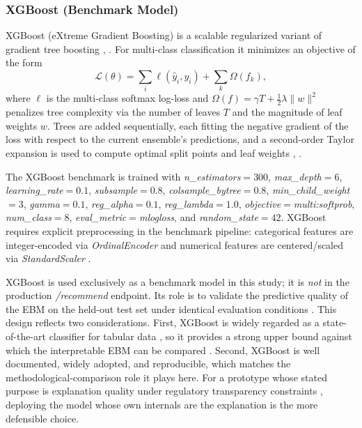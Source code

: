\documentclass{icsthesis}
\begin{document}
\begin{mainmatter}
				\subsubsection{XGBoost (Benchmark Model)}
					XGBoost (eXtreme Gradient Boosting) is a scalable regularized variant of gradient tree boosting \cite{ref16}, \cite{ref67}. For multi-class classification it minimizes an objective of the form
					\begin{equation*}
					    \mathcal{L}(\theta) = \sum_{i} \ell(\hat{y}_i, y_i) + \sum_{k} \Omega(f_k),
					\end{equation*}
					where $\ell$ is the multi-class softmax log-loss and $\Omega(f) = \gamma T + \tfrac{1}{2}\lambda \| w \|^2$ penalizes tree complexity via the number of leaves $T$ and the magnitude of leaf weights $w$. Trees are added sequentially, each fitting the negative gradient of the loss with respect to the current ensemble's predictions, and a second-order Taylor expansion is used to compute optimal split points and leaf weights \cite{ref16}, \cite{ref67}.

					The XGBoost benchmark is trained with \emph{n\_estimators}$=300$, \emph{max\_depth}$=6$, \emph{learning\_rate}$=0.1$, \emph{subsample}$=0.8$, \emph{colsample\_bytree}$=0.8$, \emph{min\_child\_weight}$=3$, \emph{gamma}$=0.1$, \emph{reg\_alpha}$=0.1$, \emph{reg\_lambda}$=1.0$, \emph{objective}$=$\emph{multi:softprob}, \emph{num\_class}$=8$, \emph{eval\_metric}$=$\emph{mlogloss}, and \emph{random\_state}$=42$. XGBoost requires explicit preprocessing in the benchmark pipeline: categorical features are integer-encoded via \emph{OrdinalEncoder} and numerical features are centered/scaled via \emph{StandardScaler} \cite{ref74}.

					XGBoost is used exclusively as a benchmark model in this study; it is \emph{not} in the production \emph{/recommend} endpoint. Its role is to validate the predictive quality of the EBM on the held-out test set under identical evaluation conditions \cite{ref68}. This design reflects two considerations. First, XGBoost is widely regarded as a state-of-the-art classifier for tabular data \cite{ref16}, so it provides a strong upper bound against which the interpretable EBM can be compared \cite{ref51}. Second, XGBoost is well documented, widely adopted, and reproducible, which matches the methodological-comparison role it plays here. For a prototype whose stated purpose is explanation quality under regulatory transparency constraints \cite{ref44}, deploying the model whose own internals are the explanation is the more defensible choice.


\end{mainmatter}
\end{document}
